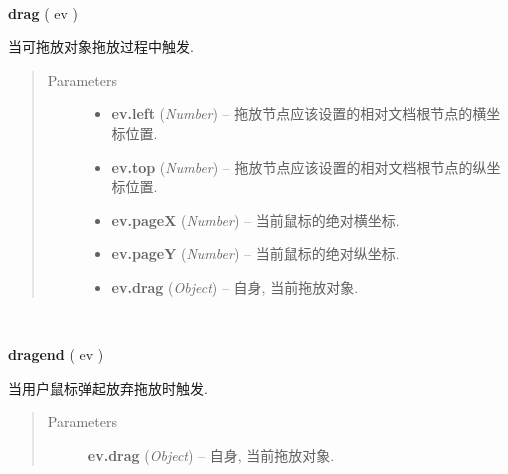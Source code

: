 \documentclass[letterpaper,10pt,english]{sphinxmanual}
\begin{document}
\begin{fulllineitems}
\label{api/component/dd/draggable:Draggable.drag}~
\begin{DUlineblock}{0em}
\item[] \textbf{drag} ( ev )
\item[] 当可拖放对象拖放过程中触发.
\end{DUlineblock}
\begin{quote}\begin{description}
\item[{Parameters}] \leavevmode\begin{itemize}
\item {}
\textbf{ev.left} (\emph{Number}) -- 拖放节点应该设置的相对文档根节点的横坐标位置.

\item {}
\textbf{ev.top} (\emph{Number}) -- 拖放节点应该设置的相对文档根节点的纵坐标位置.

\item {}
\textbf{ev.pageX} (\emph{Number}) -- 当前鼠标的绝对横坐标.

\item {}
\textbf{ev.pageY} (\emph{Number}) -- 当前鼠标的绝对纵坐标.

\item {}
\textbf{ev.drag} (\emph{Object}) -- 自身, 当前拖放对象.

\end{itemize}

\end{description}\end{quote}

\end{fulllineitems}



\begin{fulllineitems}
\label{api/component/dd/draggable:Draggable.dragend}~
\begin{DUlineblock}{0em}
\item[] \textbf{dragend} ( ev )
\item[] 当用户鼠标弹起放弃拖放时触发.
\end{DUlineblock}
\begin{quote}\begin{description}
\item[{Parameters}] \leavevmode
\textbf{ev.drag} (\emph{Object}) -- 自身, 当前拖放对象.

\end{description}\end{quote}

\end{fulllineitems}
\end{document}
